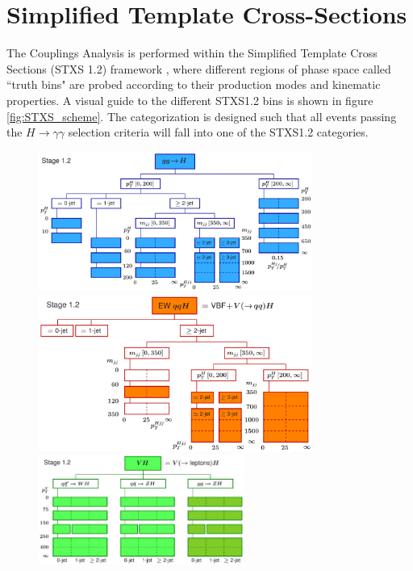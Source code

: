 \section{Simplified Template Cross-Sections} \label{sec:STXS}

The Couplings Analysis is performed within the Simplified Template Cross Sections (STXS 1.2) framework \cite{YellowReport4}, where different regions of phase space called ``truth bins" are probed according to their production modes and kinematic properties. A visual guide to the different STXS1.2 bins is shown in figure \ref{fig:STXS_scheme}. The categorization is designed such that all events passing the $H \rightarrow \gamma \gamma$ selection criteria will fall into one of the STXS1.2 categories.

\begin{figure}[tbp]
  \centering
  \includegraphics[width=0.8\textwidth]{figures/theory_chapter/simplifiedXS_ggF_1_2} \\[3mm]
  \includegraphics[width=0.8\textwidth]{figures/theory_chapter/simplifiedXS_VBF_1_2} \\[3mm]
  \includegraphics[width=0.6\textwidth]{figures/theory_chapter/simplifiedXS_VH_1_2}

\end{figure}
